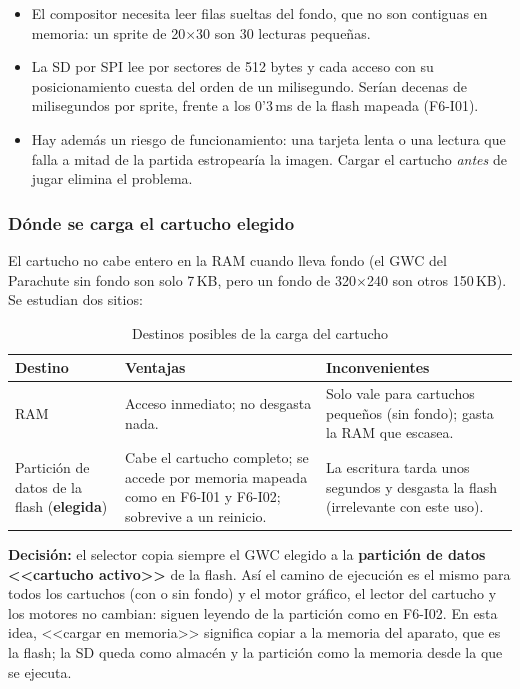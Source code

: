 \begin{itemize}
	\item El compositor necesita leer filas sueltas del fondo, que no son contiguas en memoria: un sprite de 20$\times$30 son 30 lecturas pequeñas.
	\item La SD por SPI lee por sectores de 512 bytes y cada acceso con su posicionamiento cuesta del orden de un milisegundo. Serían decenas de milisegundos por sprite, frente a los 0'3\,ms de la flash mapeada (F6-I01).
	\item Hay además un riesgo de funcionamiento: una tarjeta lenta o una lectura que falla a mitad de la partida estropearía la imagen. Cargar el cartucho \emph{antes} de jugar elimina el problema.
\end{itemize}

\subsubsection{Dónde se carga el cartucho elegido}

El cartucho no cabe entero en la RAM cuando lleva fondo (el GWC del Parachute sin fondo son solo 7\,KB, pero un fondo de 320$\times$240 son otros 150\,KB). Se estudian dos sitios:

\begin{table}[H]
	\centering
	\begin{tabular}{p{3.2cm}p{4.5cm}p{4.5cm}}
		\toprule
		Destino & Ventajas & Inconvenientes \\
		\midrule
		RAM & Acceso inmediato; no desgasta nada. & Solo vale para cartuchos pequeños (sin fondo); gasta la RAM que escasea. \\
		Partición de datos de la flash (\textbf{elegida}) & Cabe el cartucho completo; se accede por memoria mapeada como en F6-I01 y F6-I02; sobrevive a un reinicio. & La escritura tarda unos segundos y desgasta la flash (irrelevante con este uso). \\
		\bottomrule
	\end{tabular}
	\caption{Destinos posibles de la carga del cartucho}
	\label{tab:F7I01Destinos}
\end{table}

\textbf{Decisión:} el selector copia siempre el GWC elegido a la \textbf{partición de datos <<cartucho activo>>} de la flash. Así el camino de ejecución es el mismo para todos los cartuchos (con o sin fondo) y el motor gráfico, el lector del cartucho y los motores no cambian: siguen leyendo de la partición como en F6-I02. En esta idea, <<cargar en memoria>> significa copiar a la memoria del aparato, que es la flash; la SD queda como almacén y la partición como la memoria desde la que se ejecuta.


